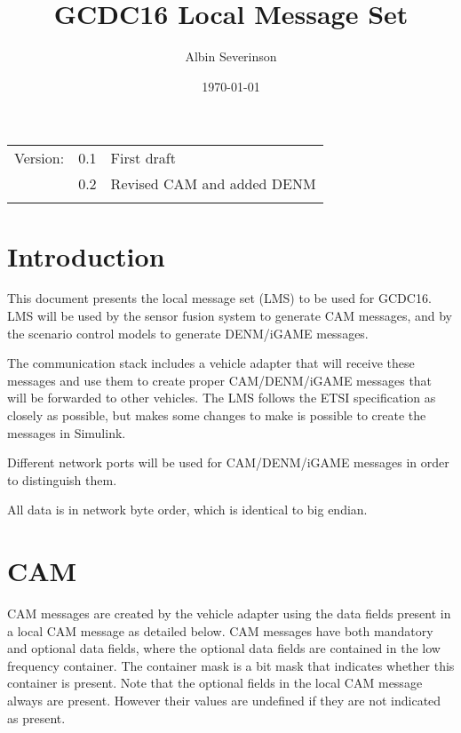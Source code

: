\documentclass[11pt]{article}
\author{Albin Severinson}
\date{\today}
\title{GCDC16 Local Message Set}
\begin{document}
\maketitle
\tableofcontents

\begin{center}
\begin{tabular}{lrl}
Version: & 0.1 & First draft\\
 & 0.2 & Revised CAM and added DENM\\
 &  & \\
\end{tabular}
\end{center}

\newpage
\section{Introduction}
\label{sec:orgheadline1}
This document presents the local message set (LMS) to be used for
GCDC16. LMS will be used by the sensor fusion system to generate CAM
messages, and by the scenario control models to generate DENM/iGAME
messages.

The communication stack includes a vehicle adapter that will receive
these messages and use them to create proper CAM/DENM/iGAME messages
that will be forwarded to other vehicles. The LMS follows the ETSI
specification as closely as possible, but makes some changes to make
is possible to create the messages in Simulink.

Different network ports will be used for CAM/DENM/iGAME messages in
order to distinguish them.

All data is in network byte order, which is identical to big endian.


\newpage
\section{CAM}
\label{sec:orgheadline2}
CAM messages are created by the vehicle adapter using the data fields
present in a local CAM message as detailed below. CAM messages have
both mandatory and optional data fields, where the optional data
fields are contained in the low frequency container. The container
mask is a bit mask that indicates whether this container is present.
Note that the optional fields in the local CAM message always are
present. However their values are undefined if they are not indicated
as present.
\end{document}
